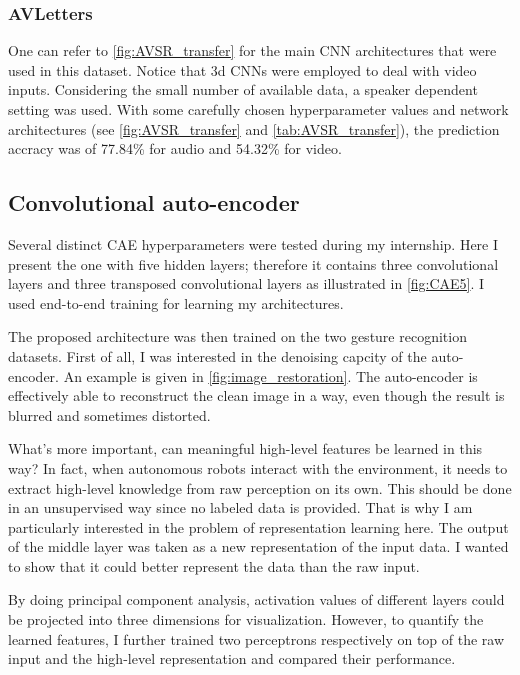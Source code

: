 \subsubsection{AVLetters}

One can refer to \autoref{fig:AVSR_transfer} for the main CNN architectures
that were used in this dataset. 
Notice that 3d CNNs were employed to deal with video inputs.
Considering the small number of available data, a speaker dependent
setting was used.
With some carefully chosen hyperparameter values and network architectures
(see \autoref{fig:AVSR_transfer} and \autoref{tab:AVSR_transfer}),
the prediction accracy was of 77.84\% for audio and 54.32\% for video.

\subsection{Convolutional auto-encoder} \label{subsection:CAE}

Several distinct CAE hyperparameters were tested during my internship.
Here I present the one with five hidden layers; therefore it contains
three convolutional layers and three transposed convolutional layers
as illustrated in \autoref{fig:CAE5}. I used end-to-end training for
learning my architectures.

The proposed architecture was then trained on the two gesture recognition
datasets. First of all, I was interested in the denoising capcity of
the auto-encoder. An example is given in \autoref{fig:image_restoration}.
The auto-encoder is effectively able to reconstruct the clean image in
a way, even though the result is blurred and sometimes distorted.

What's more important, can meaningful high-level features be
learned in this way? 
In fact, when autonomous robots interact with the environment, it needs
to extract high-level knowledge from raw perception on its own.
This should be done in an unsupervised way since no labeled data
is provided.
That is why I am particularly interested in the problem of representation
learning here. The output of the middle layer was taken as a new
representation of the input data.
I wanted to show that it could better represent the data than the raw input.

By doing principal component analysis, activation values of different
layers could be projected into three dimensions for visualization.
However, to quantify the learned features, I further trained two perceptrons
respectively on top of the raw input and the high-level representation
and compared their performance.

